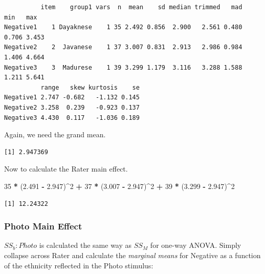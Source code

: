 \documentclass[
  11pt,
]{book}
\newenvironment{Shaded}{\begin{snugshade}}{\end{snugshade}}
\newcommand{\DecValTok}[1]{\textcolor[rgb]{0.06,0.06,0.06}{#1}}
\newcommand{\FloatTok}[1]{\textcolor[rgb]{0.06,0.06,0.06}{#1}}
\newcommand{\FunctionTok}[1]{\textcolor[rgb]{0.27,0.27,0.27}{\textbf{#1}}}
\newcommand{\NormalTok}[1]{#1}
\newcommand{\SpecialCharTok}[1]{\textcolor[rgb]{0.43,0.43,0.43}{\textbf{#1}}}
\begin{document}
\begin{verbatim}
          item    group1 vars  n  mean    sd median trimmed   mad   min   max
Negative1    1 Dayaknese    1 35 2.492 0.856  2.900   2.561 0.480 0.706 3.453
Negative2    2  Javanese    1 37 3.007 0.831  2.913   2.986 0.984 1.406 4.664
Negative3    3  Madurese    1 39 3.299 1.179  3.116   3.288 1.588 1.211 5.641
          range   skew kurtosis    se
Negative1 2.747 -0.682   -1.132 0.145
Negative2 3.258  0.239   -0.923 0.137
Negative3 4.430  0.117   -1.036 0.189
\end{verbatim}

Again, we need the grand mean.

\begin{Shaded}
\end{Shaded}

\begin{verbatim}
[1] 2.947369
\end{verbatim}

Now to calculate the Rater main effect.

\begin{Shaded}
\begin{Highlighting}[]
\DecValTok{35} \SpecialCharTok{*}\NormalTok{ (}\FloatTok{2.491} \SpecialCharTok{{-}} \FloatTok{2.947}\NormalTok{)}\SpecialCharTok{\^{}}\DecValTok{2} \SpecialCharTok{+} \DecValTok{37} \SpecialCharTok{*}\NormalTok{ (}\FloatTok{3.007} \SpecialCharTok{{-}} \FloatTok{2.947}\NormalTok{)}\SpecialCharTok{\^{}}\DecValTok{2} \SpecialCharTok{+} \DecValTok{39} \SpecialCharTok{*}\NormalTok{ (}\FloatTok{3.299} \SpecialCharTok{{-}} \FloatTok{2.947}\NormalTok{)}\SpecialCharTok{\^{}}\DecValTok{2}
\end{Highlighting}
\end{Shaded}

\begin{verbatim}
[1] 12.24322
\end{verbatim}

\hypertarget{photo-main-effect}{%
\subsubsection{Photo Main Effect}\label{photo-main-effect}}

\(SS_b:Photo\) is calculated the same way as \(SS_M\) for one-way ANOVA. Simply collapse across Rater and calculate the \emph{marginal means} for Negative as a function of the ethnicity reflected in the Photo stimulus:
\end{document}
